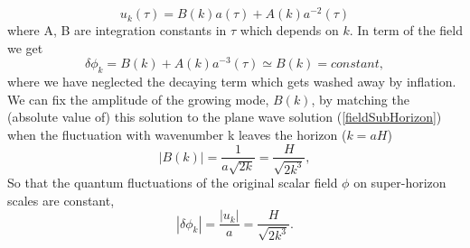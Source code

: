 \documentclass[11pt,a4paper,twoside]{book}
\begin{document}
\begin{equation}
	\label{solutionSuperHorizon}
	u_{k}(\tau) = B(k)a(\tau) + A(k)a^{-2}(\tau)
\end{equation}
where A, B are integration constants in $ \tau $ which depends on $ k $. In term of the field we get
\begin{equation}
	\delta\phi_{k} = B(k) + A(k)a^{-3}(\tau) \simeq B(k) = constant,
\end{equation}
where we have neglected the decaying term which gets washed away by inflation.\\
We can fix the amplitude of the growing mode, $ B(k) $, by matching the (absolute value of) this solution to the plane wave solution (\ref{fieldSubHorizon}) when the fluctuation with wavenumber k leaves the horizon ($ k = aH $)
\begin{equation}
	|B(k)|= \frac{1}{a\sqrt{2k}} = \frac{H}{\sqrt{2k^{3}}},
\end{equation}
So that the quantum fluctuations of the original scalar field $ \phi $ on super-horizon scales are constant,
\begin{equation}
	\label{frozenField}
	|\delta \phi_{k}| = \frac{|u_{k}|}{a} = \frac{H}{\sqrt{2k^{3}}}.
\end{equation}
\end{document}
